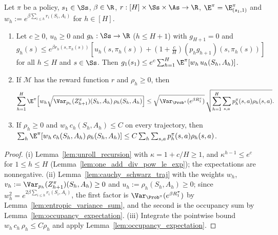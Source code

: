 \begin{lemma}\label{lem:pos_core_unroll}
\leanok
{}
Let $\pi$ be a policy, $s_1 \in \Ss$, $\beta \in \R$, $r : [H] \times \Ss \times \As \to \R$,
$\E^\pi = \E^\pi_{(s_1, 1)}$ and $w_h := e^{\beta\sum_{i \le h} r_i(S_i, A_i)}$ for $h \in [H]$.
\begin{enumerate}
  \item[(i)] Let $c \ge 0$, $u_h \ge 0$ and $g_h : \Ss \to \R$ ($h \le H + 1$) with $g_{H+1} = 0$ and
  $g_h(s) \le e^{\beta r_h(s,\pi_h(s))}[u_h(s, \pi_h(s)) + (1 + \frac cH)(p_h g_{h+1})(s, \pi_h(s))]$
  for all $h \le H$ and $s \in \Ss$. Then $g_1(s_1) \le e^c\sum_{h=1}^H\E^\pi[w_h\,u_h(S_h, A_h)]$.
  \item[(ii)] If $\mathcal M$ has the reward function $r$ and $\rho_h \ge 0$, then
  \[
    \sum_{h=1}^H\E^\pi\Big[w_h\sqrt{\Var_{p_h}(Z^\pi_{h+1})(S_h, A_h)\,\rho_h(S_h, A_h)}\Big]
    \le \sqrt{\Var_{\Prob^\pi}(e^{\beta R_1^\pi})}\,\sqrt{\sum_{h=1}^H\sum_{s,a}p^\pi_h(s,a)\rho_h(s,a)} .
  \]
  \item[(iii)] If $\rho_h \ge 0$ and $w_h\,c_h(S_h, A_h) \le C$ on every trajectory, then
  $\sum_h\E^\pi[w_h\,c_h(S_h, A_h)\,\rho_h(S_h, A_h)] \le C\sum_h\sum_{s,a}p^\pi_h(s,a)\rho_h(s,a)$.
\end{enumerate}
\end{lemma}

\begin{proof}
\leanok
(i) Lemma~\ref{lem:unroll_recursion} with $\kappa = 1 + c/H \ge 1$, and $\kappa^{h-1} \le e^c$ for
$1 \le h \le H$ (Lemma~\ref{lem:one_add_div_pow_le_exp}); the expectations are nonnegative.
(ii) Lemma~\ref{lem:cauchy_schwarz_traj} with the weights $w_h$, $v_h := \Var_{p_h}(Z^\pi_{h+1})(S_h, A_h) \ge 0$
and $u_h := \rho_h(S_h, A_h) \ge 0$; since $w_h^2 = e^{2\beta\sum_{i \le h} r_i(S_i,A_i)}$, the first factor is
$\Var_{\Prob^\pi}(e^{\beta R_1^\pi})$ by Lemma~\ref{lem:entropic_variance_sum}, and the second is the occupancy
sum by Lemma~\ref{lem:occupancy_expectation}. (iii) Integrate the pointwise bound
$w_h\,c_h\,\rho_h \le C\rho_h$ and apply Lemma~\ref{lem:occupancy_expectation}.
\end{proof}


